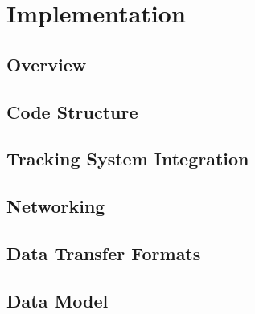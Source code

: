 
\chapter[Implementation]{Implementation} %

\label{Chapter9} %


\section{Overview}



\section{Code Structure}



\section{Tracking System Integration} \label{TrackingSystemIntegration}



\section{Networking}



\section{Data Transfer Formats}



\section{Data Model}


